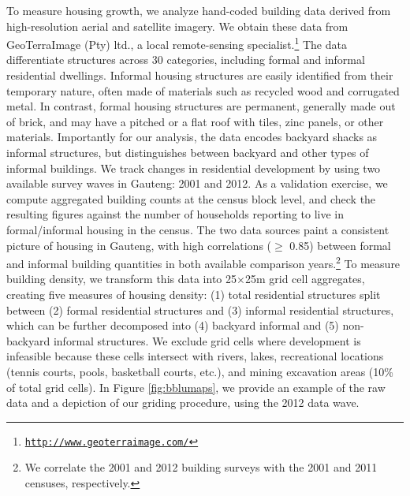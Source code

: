 \documentclass[12pt]{article}
\begin{document}

To measure housing growth, we analyze hand-coded building data derived from high-resolution aerial and satellite imagery. We obtain these data from GeoTerraImage (Pty) ltd., a local remote-sensing specialist.\footnote{\href{http://www.geoterraimage.com/}{\tt http://www.geoterraimage.com/}} The data differentiate structures across 30 categories, including formal and informal residential dwellings. Informal housing structures are easily identified from their temporary nature, often made of materials such as recycled wood and corrugated metal. In contrast, formal housing structures are permanent, generally made out of brick, and may have a pitched or a flat roof with tiles, zinc panels, or other materials. Importantly for our analysis, the data encodes backyard shacks as informal structures, but distinguishes between backyard and other types of informal buildings. We track changes in residential development by using two available survey waves in Gauteng: 2001 and 2012. As a validation exercise, we compute aggregated building counts at the census block level, and check the resulting figures against the number of households reporting to live in formal/informal housing in the census. The two data sources paint a consistent picture of housing in Gauteng, with high correlations ($\geq$ 0.85) between formal and informal building quantities in both available comparison years.\footnote{We correlate the 2001 and 2012 building surveys with the 2001 and 2011 censuses, respectively.}  To measure building density, we transform this data into 25$\times$25m grid cell aggregates, creating five measures of housing density: (1) total residential structures split between (2) formal residential structures and (3) informal residential structures, which can be further decomposed into (4) backyard informal and (5) non-backyard informal structures.  We exclude grid cells where development is infeasible because these cells intersect with rivers, lakes, recreational locations (tennis courts, pools, basketball courts, etc.), and mining excavation areas (10\% of total grid cells).  In Figure \ref{fig:bblumaps}, we provide an example of the raw data and a depiction of our griding procedure, using the 2012 data wave.
\end{document}
